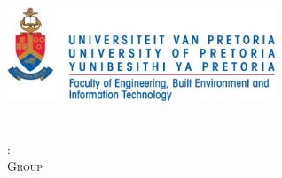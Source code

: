 

\begin{titlepage}
    \begin{center}

        \vspace*{2cm}
    
        \includegraphics[width=0.6\textwidth]{plots/UPEBITlogo.jpg}\\[2.0cm]    
    	
        \textsc{\LARGE\bfseries \modulecode}\\[1.0cm]
    	
        \textsc{\Large\bfseries \modulename}\\[0.75cm]
    
        \textsc{\large\assessment:~\assessmenttitle}\\[0.5cm]
        
        \textsc{\large Group \groupnumber}\\[1.0cm]
        

\end{center}
\end{titlepage}
